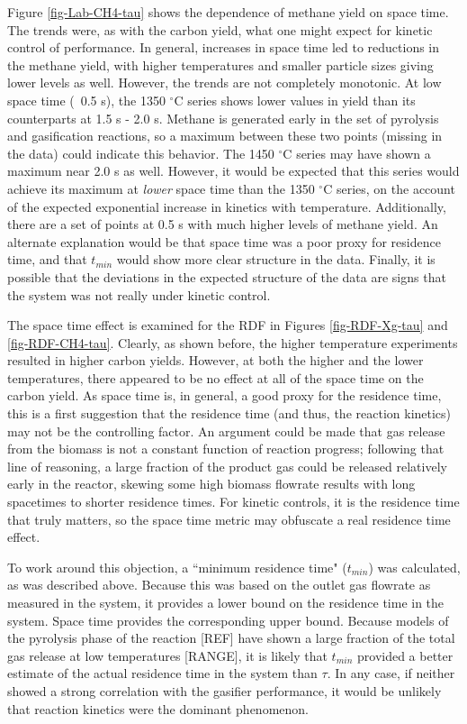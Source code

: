 \documentclass[11pt,twocolumn]{article}
\begin{document}
Figure \ref{fig-Lab-CH4-tau} shows the dependence of methane yield on space time.  The trends were, as with the carbon yield, what one might expect for kinetic control of performance.  In general, increases in space time led to reductions in the methane yield, with higher temperatures and smaller particle sizes giving lower levels as well.  However, the trends are not completely monotonic.  At low space time (~0.5 s), the 1350 $^{\circ}$C series shows lower values in yield than its counterparts at 1.5 s - 2.0 s.  Methane is generated early in the set of pyrolysis and gasification reactions, so a maximum between these two points (missing in the data) could indicate this behavior.  The 1450 $^{\circ}$C series may have shown a maximum near 2.0 s as well.  However, it would be expected that this series would achieve its maximum at \emph{lower} space time than the 1350 $^{\circ}$C series, on the account of the expected exponential increase in kinetics with temperature.  Additionally, there are a set of points at 0.5 s with much higher levels of methane yield.  An alternate explanation would be that space time was a poor proxy for residence time, and that $t_{min}$ would show more clear structure in the data.  Finally, it is possible that the deviations in the expected structure of the data are signs that the system was not really under kinetic control.

The space time effect is examined for the RDF in Figures \ref{fig-RDF-Xg-tau} and \ref{fig-RDF-CH4-tau}.  Clearly, as shown before, the higher temperature experiments resulted in higher carbon yields.  However, at both the higher and the lower temperatures, there appeared to be no effect at all of the space time on the carbon yield.  As space time is, in general, a good proxy for the residence time, this is a first suggestion that the residence time (and thus, the reaction kinetics) may not be the controlling factor.  An argument could be made that gas release from the biomass is not a constant function of reaction progress; following that line of reasoning, a large fraction of the product gas could be released relatively early in the reactor, skewing some high biomass flowrate results with long spacetimes to shorter residence times.  For kinetic controls, it is the residence time that truly matters, so the space time metric may obfuscate a real residence time effect.

To work around this objection, a ``minimum residence time" ($t_{min}$) was calculated, as was described above.  Because this was based on the outlet gas flowrate as measured in the system, it provides a lower bound on the residence time in the system.  Space time provides the corresponding upper bound.  Because models of the pyrolysis phase of the reaction [REF] have shown a large fraction of the total gas release at low temperatures [RANGE], it is likely that $t_{min}$ provided a better estimate of the actual residence time in the system than $\tau$.  In any case, if neither showed a strong correlation with the gasifier performance, it would be unlikely that reaction kinetics were the dominant phenomenon.
\end{document}
